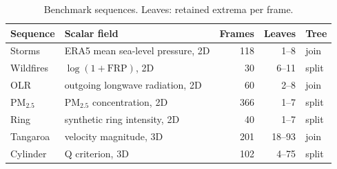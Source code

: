 \documentclass[review]{vgtc}
\begin{document}
\begin{table}[t]
\caption{Benchmark sequences. Leaves: retained extrema per frame.}\label{tab:data}
\centering\scriptsize\setlength{\tabcolsep}{3pt}
\begin{tabular}{llrrl}\toprule
Sequence & Scalar field & Frames & Leaves & Tree\\\midrule
Storms & ERA5 mean sea-level pressure, 2D & 118 & 1--8 & join\\
Wildfires & $\log(1+\mathrm{FRP})$, 2D & 30 & 6--11 & split\\
OLR & outgoing longwave radiation, 2D & 60 & 2--8 & join\\
PM$_{2.5}$ & PM$_{2.5}$ concentration, 2D & 366 & 1--7 & split\\
Ring & synthetic ring intensity, 2D & 40 & 1--7 & split\\
Tangaroa & velocity magnitude, 3D & 201 & 18--93 & join\\
Cylinder & Q criterion, 3D & 102 & 4--75 & split\\\bottomrule
\end{tabular}
\end{table}
\end{document}

